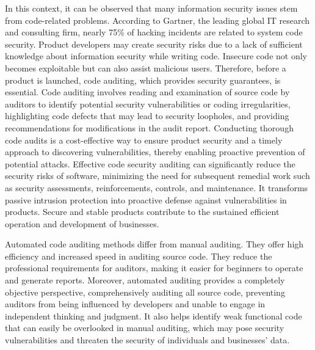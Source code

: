 \documentclass[journal]{IEEEtran}
\begin{document}
In this context, it can be observed that many information security issues stem from code-related problems. According to Gartner, the leading global IT research and consulting firm, nearly 75\% of hacking incidents are related to system code security. Product developers may create security risks due to a lack of sufficient knowledge about information security while writing code. Insecure code not only becomes exploitable but can also assist malicious users. Therefore, before a product is launched, code auditing, which provides security guarantees, is essential. Code auditing involves reading and examination of source code by auditors to identify potential security vulnerabilities or coding irregularities, highlighting code defects that may lead to security loopholes, and providing recommendations for modifications in the audit report. Conducting thorough code audits is a cost-effective way to ensure product security and a timely approach to discovering vulnerabilities, thereby enabling proactive prevention of potential attacks. Effective code security auditing can significantly reduce the security risks of software, minimizing the need for subsequent remedial work such as security assessments, reinforcements, controls, and maintenance. It transforms passive intrusion protection into proactive defense against vulnerabilities in products. Secure and stable products contribute to the sustained efficient operation and development of businesses.

Automated code auditing methods differ from manual auditing. They offer high efficiency and increased speed in auditing source code. They reduce the professional requirements for auditors, making it easier for beginners to operate and generate reports. Moreover, automated auditing provides a completely objective perspective, comprehensively auditing all source code, preventing auditors from being influenced by developers and unable to engage in independent thinking and judgment. It also helps identify weak functional code that can easily be overlooked in manual auditing, which may pose security vulnerabilities and threaten the security of individuals and businesses' data.
\end{document}
